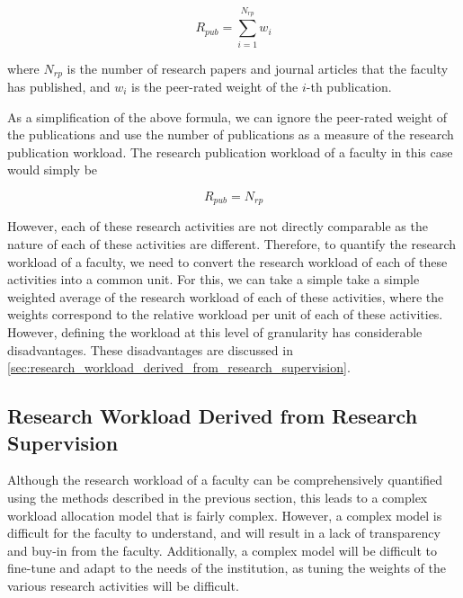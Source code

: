 \begin{enumerate}
            \begin{equation*}
                  R_{pub} = \sum_{i=1}^{N_{rp}} w_i
            \end{equation*}

            where $N_{rp}$ is the number of research papers and journal articles that the faculty has published, and $w_i$ is the peer-rated weight of the $i$-th publication.

            As a simplification of the above formula, we can ignore the peer-rated weight of the publications and use the number of publications as a measure of the research publication workload. The research publication workload of a faculty in this case would simply be

            \begin{equation*}
                  R_{pub} = N_{rp}
            \end{equation*}

\end{enumerate}

However, each of these research activities are not directly comparable as the nature of each of these activities are different. Therefore, to quantify the research workload of a faculty, we need to convert the research workload of each of these activities into a common unit. For this, we can take a simple take a simple weighted average of the research workload of each of these activities, where the weights correspond to the relative workload per unit of each of these activities. However, defining the workload at this level of granularity has considerable disadvantages. These disadvantages are discussed in \autoref{sec:research_workload_derived_from_research_supervision}.


\subsection{Research Workload Derived from Research Supervision}
\label{sec:research_workload_derived_from_research_supervision}

Although the research workload of a faculty can be comprehensively quantified using the methods described in the previous section, this leads to a complex workload allocation model that is fairly complex. However, a complex model is difficult for the faculty to understand, and will result in a lack of transparency and buy-in from the faculty. Additionally, a complex model will be difficult to fine-tune and adapt to the needs of the institution, as tuning the weights of the various research activities will be difficult.

